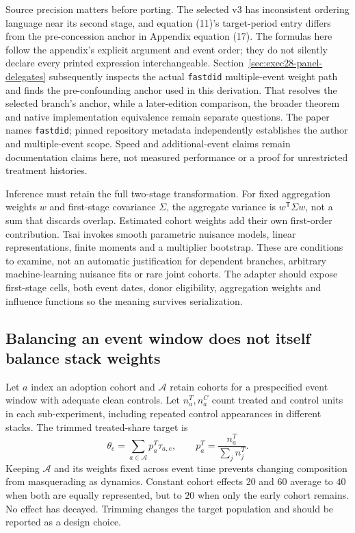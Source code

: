 Source precision matters before porting. The selected v3 has inconsistent ordering language near its second stage, and
equation (11)'s target-period entry differs from the pre-concession anchor in Appendix equation (17).
The formulas here follow the appendix's explicit argument and event order; they do not silently declare every printed
expression interchangeable. Section~\ref{sec:exec28-panel-delegates} subsequently inspects the actual
\texttt{fastdid} multiple-event weight path and finds the pre-confounding anchor used in this derivation.
That resolves the selected branch's anchor, while a later-edition comparison, the broader theorem and native
implementation equivalence remain separate questions. The paper names \texttt{fastdid}; pinned repository metadata
independently establishes the author and multiple-event scope. Speed and additional-event claims remain documentation
claims here, not measured performance or a proof for unrestricted treatment histories.~\citep{exec28_panel_tsai,exec28_panel_software}

Inference must retain the full two-stage transformation. For fixed aggregation weights $w$ and first-stage covariance
$\Sigma$, the aggregate variance is $w^{\mathsf T}\Sigma w$, not a sum that discards overlap. Estimated cohort weights
add their own first-order contribution. Tsai invokes smooth parametric nuisance models, linear representations, finite
moments and a multiplier bootstrap. These are conditions to examine, not an automatic justification for dependent branches,
arbitrary machine-learning nuisance fits or rare joint cohorts. The adapter should expose first-stage cells, both event
dates, donor eligibility, aggregation weights and influence functions so the meaning survives serialization.~\citep{exec28_panel_tsai}

\subsection{Balancing an event window does not itself balance stack weights}

Let $a$ index an adoption cohort and $\mathcal A$ retain cohorts for a prespecified event window with adequate clean
controls. Let $n_a^T,n_a^C$ count treated and control units in each sub-experiment, including repeated control appearances
in different stacks. The trimmed treated-share target is
\[
 \theta_e=\sum_{a\in\mathcal A}p_a^T\tau_{a,e},\qquad p_a^T=\frac{n_a^T}{\sum_j n_j^T}.
\]
Keeping $\mathcal A$ and its weights fixed across event time prevents changing composition from masquerading as dynamics.
Constant cohort effects $20$ and $60$ average to $40$ when both are equally represented, but to $20$ when only the early
cohort remains. No effect has decayed. Trimming changes the target population and should be reported as a design choice.
\citep{exec28_panel_wing,exec28_panel_reference}

